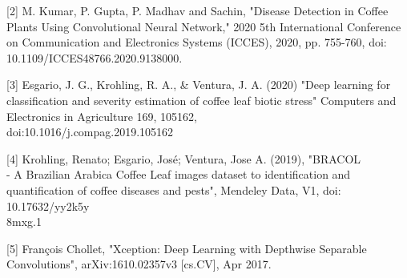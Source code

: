 \documentclass[a4paper,14pt]{extarticle}
\begin{document}
[2] M. Kumar, P. Gupta, P. Madhav and Sachin, "Disease Detection in Coffee Plants Using Convolutional Neural Network," 2020 5th International Conference on Communication and Electronics Systems (ICCES), 2020, pp. 755-760, doi: 10.1109/ICCES48766.2020.9138000.

[3] Esgario, J. G., Krohling, R. A., \& Ventura, J. A. (2020) "Deep learning for classification and severity estimation of coffee leaf biotic stress" Computers and Electronics in Agriculture 169, 105162,\\doi:10.1016/j.compag.2019.105162

[4] Krohling, Renato; Esgario, José; Ventura, Jose A. (2019), "BRACOL\\- A Brazilian Arabica Coffee Leaf images dataset to identification and quantification of coffee diseases and pests", Mendeley Data, V1, doi: 10.17632/yy2k5y\\8mxg.1

[5] François Chollet, "Xception: Deep Learning with Depthwise Separable Convolutions", arXiv:1610.02357v3 [cs.CV], Apr 2017.
\end{document}
